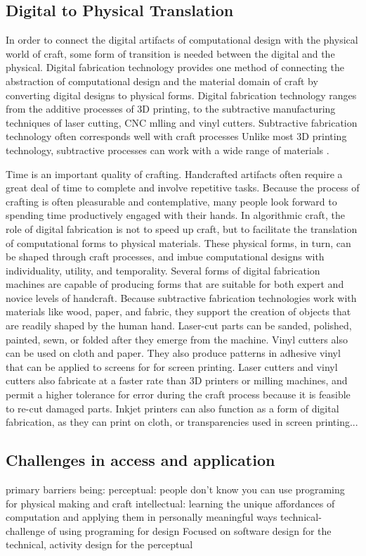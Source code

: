 \documentclass{sigchi}
\begin{document}
\subsection{Digital to Physical Translation}
In order to connect the digital artifacts of computational design with the physical world of craft, some form of transition is needed between the digital and the physical. Digital fabrication technology provides one method of connecting the abstraction of computational design and the material domain of craft by converting digital designs to physical forms. Digital fabrication technology ranges from the additive processes of 3D printing, to the subtractive manufacturing techniques of laser cutting, CNC mlling and vinyl cutters. Subtractive fabrication technology often corresponds well with craft processes Unlike most 3D printing technology, subtractive processes can work with a wide range of materials \cite{dunn}.

Time is an important quality of crafting. Handcrafted artifacts often require a great deal of time to complete and involve repetitive tasks. Because the process of crafting is often pleasurable and contemplative, many people look forward to spending time productively engaged with their hands. In algorithmic craft, the role of digital fabrication is not to speed up craft, but to facilitate the translation of computational forms to physical materials. These physical forms, in turn, can be shaped through craft processes, and imbue computational designs with individuality, utility, and temporality. Several forms of digital fabrication machines are capable of producing forms that are suitable for both expert and novice levels of handcraft. Because subtractive fabrication technologies work with materials like wood, paper, and fabric, they support the creation of objects that are readily shaped by the human hand. Laser-cut parts can be sanded, polished, painted, sewn, or folded after they emerge from the machine. Vinyl cutters also can be used on cloth and paper. They also produce patterns in adhesive vinyl that can be applied to screens for for screen printing. Laser cutters and vinyl cutters also fabricate at a faster rate than 3D printers or milling machines, and permit a higher tolerance for error during the craft process because it is feasible to re-cut damaged parts. Inkjet printers can also function as a form of digital fabrication, as they can print on cloth, or transparencies used in screen printing...

\subsection{Challenges in access and application}
primary barriers being:
perceptual: people don't know you can use programing for physical making and craft
intellectual: learning the unique affordances of computation and applying them in personally meaningful ways
technical- challenge of using programing for design
Focused on software design for the technical, activity design for the perceptual
\end{document}
